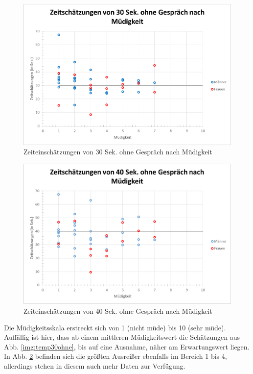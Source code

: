 \documentclass{Paper}
\begin{document}
\begin{figure}[H]
	\centering
	\includegraphics[scale=0.7]{../Diagramme/scatterPre/30ohne_muedigkeit.png}
	\caption{Zeiteinschätzungen von 30 Sek. ohne Gespräch nach Müdigkeit}
	\label{img:mued30ohne}
\end{figure}
\begin{figure}[H]
	\centering
	\includegraphics[scale=0.7]{../Diagramme/scatterPre/40ohne_muedigkeit.png}
	\caption{Zeiteinschätzungen von 40 Sek. ohne Gespräch nach Müdigkeit}
	\label{img:mued40ohne}
\end{figure}
Die Müdigkeitsskala erstreckt sich von 1 (nicht müde) bis 10 (sehr müde). Auffällig ist hier, dass ab einem mittleren Müdigkeitswert die Schätzungen aus Abb. \ref{img:temp30ohne}, bis auf eine Ausnahme, näher am Erwartungswert liegen. In Abb. \ref{img:mued40ohne} befinden sich die größten Ausreißer ebenfalls im Bereich 1 bis 4, allerdings stehen in diesem auch mehr  Daten zur Verfügung.\\
\end{document}
